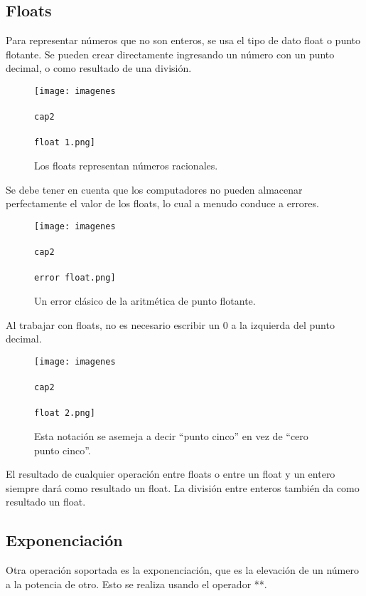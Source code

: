 \documentclass{article}
\newcommand{\doble}[1]{``#1''}
\begin{document}
\subsection{Floats}
    
Para representar números que no son enteros, se usa el tipo de dato float o punto flotante. Se pueden crear directamente ingresando un número con un punto decimal, o como resultado de una división.

\begin{figure}[ht!]
  \texttt{[image: imagenes\\\\cap2\\\\float 1.png]}
  \caption{Los floats representan números racionales.}
\end{figure}

Se debe tener en cuenta que los computadores no pueden almacenar perfectamente el valor de los floats, lo cual a menudo conduce a errores.

\begin{figure}[ht!]
  \texttt{[image: imagenes\\\\cap2\\\\error float.png]}
  \caption{Un error clásico de la aritmética de punto flotante.}
\end{figure}

Al trabajar con floats, no es necesario escribir un 0 a la izquierda del punto decimal.

\begin{figure}[ht!]
  \texttt{[image: imagenes\\\\cap2\\\\float 2.png]}
  \caption{Esta notación se asemeja a decir \doble{punto cinco} en vez de \doble{cero punto cinco}.}
\end{figure}

El resultado de cualquier operación entre floats o entre un float y un entero siempre dará como resultado un float. La división entre enteros también da como resultado un float.


\subsection{Exponenciación}

Otra operación soportada es la exponenciación, que es la elevación de un número a la potencia de otro. Esto se realiza usando el operador **.
\end{document}
